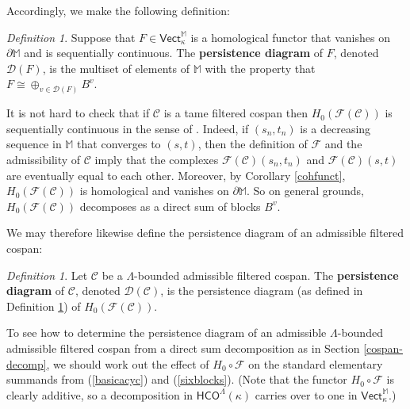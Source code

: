 \documentclass[11pt]{amsart}
\theoremstyle{definition}
\theoremstyle{remark}
\newtheorem{dfn}[theorem]{Definition}
\numberwithin{equation}{section}
\begin{document}
Accordingly, we make the following definition:

\begin{dfn}\label{persrish}
	Suppose that $F\in \mathsf{Vect}_{\kappa}^{\mathbb{M}}$ is a homological functor that vanishes on $\partial\mathbb{M}$ and is sequentially continuous.  The \textbf{persistence diagram} of $F$, denoted $\mathcal{D}(F)$, is the multiset of elements of $\mathbb{M}$ with the property that $F\cong \oplus_{v\in\mathcal{D}(F)}B^v$.
\end{dfn}

It is not hard to check that if $\mathcal{C}$ is a tame filtered cospan then $H_0(\mathcal{F}(\mathcal{C}))$ is sequentially continuous in the sense of \cite{BBF21}.  Indeed, if $(s_n,t_n)$ is a decreasing sequence in $\mathbb{M}$ that converges to $(s,t)$, then the definition of $\mathcal{F}$ and the admissibility of $\mathcal{C}$ imply that the complexes $\mathcal{F}(\mathcal{C})(s_n,t_n)$ and $\mathcal{F}(\mathcal{C})(s,t)$ are eventually equal to each other.  Moreover, by Corollary \ref{cohfunct}, $H_0(\mathcal{F}(\mathcal{C}))$ is homological and vanishes on $\partial\mathbb{M}$.  So on general grounds, $H_0(\mathcal{F}(\mathcal{C}))$ decomposes as a direct sum of blocks $B^v$. 

We may therefore likewise define the persistence diagram of an admissible filtered cospan:

\begin{dfn}
	Let $\mathcal{C}$ be a $\Lambda$-bounded admissible filtered cospan.  The \textbf{persistence diagram} of $\mathcal{C}$, denoted $\mathcal{D}(\mathcal{C})$, is the persistence diagram (as defined in Definition \ref{persrish}) of $H_0(\mathcal{F}(\mathcal{C}))$.	
\end{dfn}

To see how to determine the persistence diagram of an admissible $\Lambda$-bounded admissible filtered cospan from a direct sum decomposition as in Section \ref{cospan-decomp}, we should work out the effect of $H_0\circ\mathcal{F}$ on the standard elementary summands  from (\ref{basicacyc}) and (\ref{sixblocks}).  (Note that the functor $H_0\circ \mathcal{F}$ is clearly additive, so a decomposition in $\mathsf{HCO}^{\Lambda}(\kappa)$ carries over to one in $\mathsf{Vect}_{\kappa}^{\mathbb{M}}$.)  
\end{document}
